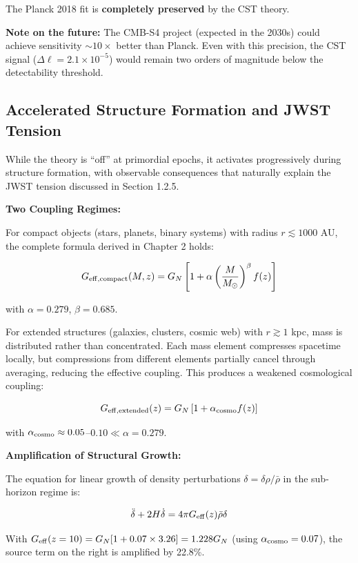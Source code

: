 \documentclass[11pt,a4paper]{article}
\begin{document}
The Planck 2018 fit is \textbf{completely preserved} by the CST theory.

\textbf{Note on the future:} The CMB-S4 project (expected in the 2030s)
could achieve sensitivity \(\sim 10\times\) better than Planck. Even
with this precision, the CST signal (\(\Delta\ell = 2.1\times10^{-5}\))
would remain two orders of magnitude below the detectability threshold.

\hypertarget{accelerated-structure-formation-and-jwst-tension}{%
\subsection{Accelerated Structure Formation and JWST
Tension}\label{accelerated-structure-formation-and-jwst-tension}}

While the theory is ``off'' at primordial epochs, it activates
progressively during structure formation, with observable consequences
that naturally explain the JWST tension discussed in Section 1.2.5.

\textbf{Two Coupling Regimes:}

For compact objects (stars, planets, binary systems) with radius
\(r \lesssim 1000\) AU, the complete formula derived in Chapter 2 holds:

\[G_{\rm eff,compact}(M,z) = G_N\left[1 + \alpha \left(\frac{M}{M_\odot}\right)^\beta f(z)\right]\]

with \(\alpha = 0.279\), \(\beta = 0.685\).

For extended structures (galaxies, clusters, cosmic web) with
\(r \gtrsim 1\) kpc, mass is distributed rather than concentrated. Each
mass element compresses spacetime locally, but compressions from
different elements partially cancel through averaging, reducing the
effective coupling. This produces a weakened cosmological coupling:

\[G_{\rm eff,extended}(z) = G_N\left[1 + \alpha_{\rm cosmo} f(z)\right]\]

with \(\alpha_{\rm cosmo} \approx 0.05\)--\(0.10 \ll \alpha = 0.279\).

\textbf{Amplification of Structural Growth:}

The equation for linear growth of density perturbations
\(\delta = \delta\rho/\bar\rho\) in the sub-horizon regime is:

\[\ddot{\delta} + 2H\dot{\delta} = 4\pi G_{\rm eff}(z) \bar\rho \delta\]

With \(G_{\rm eff}(z=10) = G_N[1 + 0.07 \times 3.26] = 1.228 G_N\)
(using \(\alpha_{\rm cosmo} = 0.07\)), the source term on the right is
amplified by 22.8\%.
\end{document}
